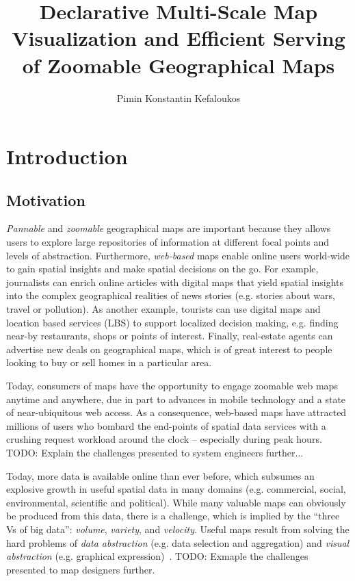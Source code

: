 \documentclass[11pt, oneside]{report}   	%
\title{Declarative Multi-Scale Map Visualization and Efficient Serving of Zoomable Geographical Maps}
\author{Pimin Konstantin Kefaloukos}
\begin{document}
\maketitle

\tableofcontents

\chapter{Introduction}


\section{Motivation}
\emph{Pannable} and \emph{zoomable} geographical maps are important because they allows users to explore large repositories of information at different focal points and levels of abstraction. Furthermore, \emph{web-based} maps enable online users world-wide to gain spatial insights and make spatial decisions on the go. For example, journalists can enrich online articles with digital maps that yield spatial insights into the complex geographical realities of news stories (e.g. stories about wars, travel or pollution). As another example, tourists can use digital maps and location based services (LBS) to support localized decision making, e.g. finding near-by restaurants, shops or points of interest. Finally, real-estate agents can advertise new deals on geographical maps, which is of great interest to people looking to buy or sell homes in a particular area. %

Today, consumers of maps have the opportunity to engage zoomable web maps anytime and anywhere, due in part to advances in mobile technology and a state of near-ubiquitous web access. As a consequence, web-based maps have attracted millions of users who bombard the end-points of spatial data services with a crushing request workload around the clock -- especially during peak hours. TODO: Explain the challenges presented to system engineers further...

Today, more data is available online than ever before, which subsumes an explosive growth in useful spatial data in many domains (e.g. commercial, social, environmental, scientific and political). While many valuable maps can obviously be produced from this data, there is a challenge, which is implied by the ``three Vs of big data'': \emph{volume}, \emph{variety}, and \emph{velocity}. Useful maps result from solving the  hard problems of \emph{data abstraction} (e.g. data selection and aggregation) and \emph{visual abstraction} (e.g. graphical expression)~\cite{jacques1967semiologie,stolte2003multiscale,weibel1999generalising}. TODO: Exmaple the challenges presented to map designers further.
\end{document}
